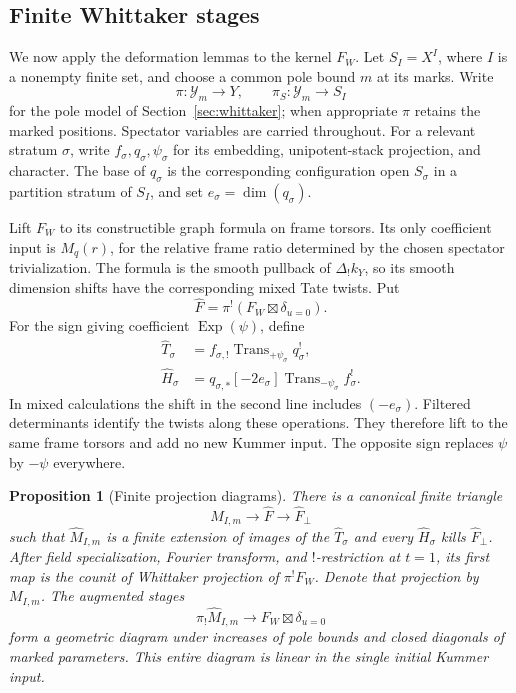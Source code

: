 \documentclass[11pt]{article}
\numberwithin{equation}{section}
\newtheorem{proposition}[theorem]{Proposition}
\theoremstyle{definition}
\theoremstyle{remark}
\begin{document}
\subsection{Finite Whittaker stages}\label{deform:finite-stages}

We now apply the deformation lemmas to the kernel $F_W$.  Let
$S_I=X^I$, where $I$ is a nonempty finite set, and choose a common
pole bound $m$ at its marks.  Write
\[
 \pi:\mathcal Y_m\longrightarrow Y,\qquad
 \pi_S:\mathcal Y_m\longrightarrow S_I
\]
for the pole model of Section~\ref{sec:whittaker}; when appropriate
$\pi$ retains the marked positions.  Spectator variables are
carried throughout.  For a relevant stratum $\sigma$, write
$f_\sigma,q_\sigma,\psi_\sigma$ for its embedding, unipotent-stack
projection, and character.  The base of $q_\sigma$ is the
corresponding configuration open $S_\sigma$ in a partition
stratum of $S_I$, and set $e_\sigma=\dim(q_\sigma)$.

Lift $F_W$ to its constructible graph formula on frame torsors.
Its only coefficient input is $M_q(r)$, for the relative frame
ratio determined by the chosen spectator trivialization.  The
formula is the smooth pullback of $\Delta_!k_Y$, so its smooth
dimension shifts have the corresponding mixed Tate twists.
Put
\[
             \widehat F=\pi^!(F_W\boxtimes\delta_{u=0}).
\]
For the sign giving coefficient $\operatorname{Exp}(\psi)$, define
\begin{equation}\label{eq:P3}
 \begin{split}
 \widehat T_\sigma&=f_{\sigma,!}
             \operatorname{Trans}_{+\psi_\sigma}q_\sigma^!,\\
 \widehat H_\sigma&=q_{\sigma,*}[-2e_\sigma]
             \operatorname{Trans}_{-\psi_\sigma}f_\sigma^!.
 \end{split}
\end{equation}
In mixed calculations the shift in the second line includes
$(-e_\sigma)$.  Filtered determinants identify the twists along
these operations.  They therefore lift to the same frame
torsors and add no new Kummer input.  The opposite sign replaces
$\psi$ by $-\psi$ everywhere.

\begin{proposition}[Finite projection diagrams]\label{deform:stages}
There is a canonical finite triangle
\[
 \widehat M_{I,m}\longrightarrow\widehat F
                  \longrightarrow\widehat F_\perp
\]
such that $\widehat M_{I,m}$ is a finite extension of images of the
$\widehat T_\sigma$ and every $\widehat H_\sigma$ kills
$\widehat F_\perp$.  After field specialization, Fourier transform,
and $!$-restriction at $t=1$, its first map is the counit of
Whittaker projection of $\pi^!F_W$.  Denote that projection by
$M_{I,m}$.  The augmented stages
\begin{equation}\label{eq:P4}
        \pi_!\widehat M_{I,m}
                    \longrightarrow F_W\boxtimes\delta_{u=0}
\end{equation}
form a geometric diagram under increases of pole bounds and
closed diagonals of marked parameters.  This entire diagram is
linear in the single initial Kummer input.
\end{proposition}
\end{document}
